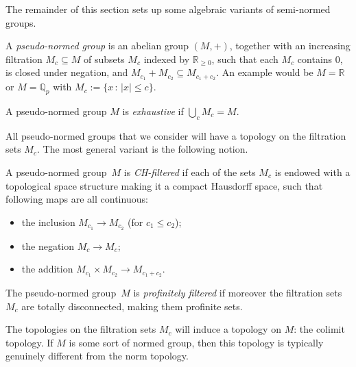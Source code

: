 The remainder of this section sets up some algebraic variants of semi-normed groups.

\begin{definition}
  \label{pseudo_normed_group}
  \leanok
  A \emph{pseudo-normed group} is an abelian group $(M,+)$,
  together with an increasing filtration $M_c \subseteq M$ of subsets $M_c$ indexed by $\mathbb R_{\ge 0}$,
  such that each $M_c$ contains $0$, is closed under negation,
  and $M_{c_1} + M_{c_2} \subseteq M_{c_1 + c_2}$. An example would be $M=\mathbb{R}$ or $M=\mathbb{Q}_p$ with $M_c :=\{x\,:\,|x|\leq c\}$.

  A pseudo-normed group $M$ is \emph{exhaustive} if $\bigcup_c M_c = M$.
\end{definition}

All pseudo-normed groups that we consider will have a topology on the filtration sets $M_c$.
The most general variant is the following notion.

\begin{definition}
  \label{chpng}
  \leanok
  A pseudo-normed group~$M$ is \emph{CH-filtered}
  if each of the sets $M_c$ is endowed with a topological space structure
  making it a compact Hausdorff space,
  such that following maps are all continuous:
  \begin{itemize}
    \item the inclusion $M_{c_1} \to M_{c_2}$ (for $c_1 \le c_2$);
    \item the negation $M_c \to M_c$;
    \item the addition $M_{c_1} \times M_{c_2} \to M_{c_1 + c_2}$.
  \end{itemize}

  The pseudo-normed group~$M$ is \emph{profinitely filtered} if moreover
  the filtration sets~$M_c$ are totally disconnected, making them profinite sets.
\end{definition}

\begin{remark}
  The topologies on the filtration sets $M_c$ will induce a topology on $M$: the colimit topology.
  If $M$ is some sort of normed group, then this topology is typically genuinely different from the norm topology.
\end{remark}


